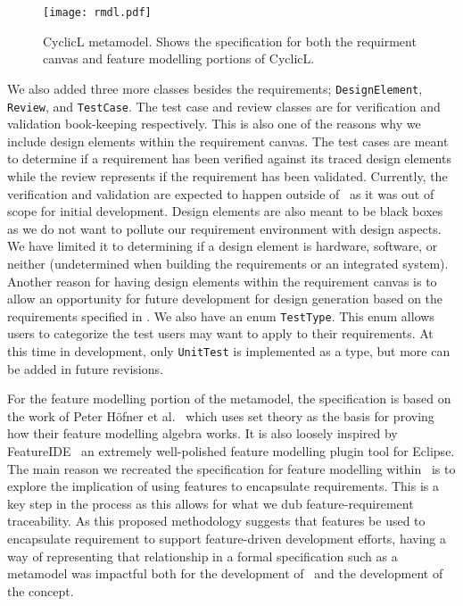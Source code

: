 \begin{figure}
	\centering
	\texttt{[image: rmdl.pdf]}
	\caption{CyclicL metamodel. Shows the specification for both the requirment canvas and feature modelling portions of CyclicL.}
	\label{fig:metamodel}
\end{figure}

We also added three more classes besides the requirements; \texttt{DesignElement}, \texttt{Review}, and \texttt{TestCase}. The test case and review classes are for verification and validation book-keeping respectively. This is also one of the reasons why we include design elements within the requirement canvas. The test cases are meant to determine if a requirement has been verified against its traced design elements while the review represents if the requirement has been validated. Currently, the verification and validation are expected to happen outside of \tool\ as it was out of scope for initial development. Design elements are also meant to be black boxes as we do not want to pollute our requirement environment with design aspects. We have limited it to determining if a design element is hardware, software, or neither (undetermined when building the requirements or an integrated system). Another reason for having design elements within the requirement canvas is to allow an opportunity for future development for design generation based on the requirements specified in \tool. We also have an enum \texttt{TestType}. This enum allows users to categorize the test users may want to apply to their requirements. At this time in development, only \texttt{UnitTest} is implemented as a type, but more can be added in future revisions.

For the feature modelling portion of the metamodel, the specification is based on the work of Peter H\"{o}fner et al.~\cite{hofner2006feature,hofner2011algebra} which uses set theory as the basis for proving how their feature modelling algebra works. It is also loosely inspired by FeatureIDE~\cite{kastner2009featureide, thum2014featureide} an extremely well-polished feature modelling plugin tool for Eclipse. The main reason we recreated the specification for feature modelling within \tool\ is to explore the implication of using features to encapsulate requirements. This is a key step in the process as this allows for what we dub feature-requirement traceability. As this proposed methodology suggests that features be used to encapsulate requirement to support feature-driven development efforts, having a way of representing that relationship in a formal specification such as a metamodel was impactful both for the development of \tool\ and the development of the concept.

